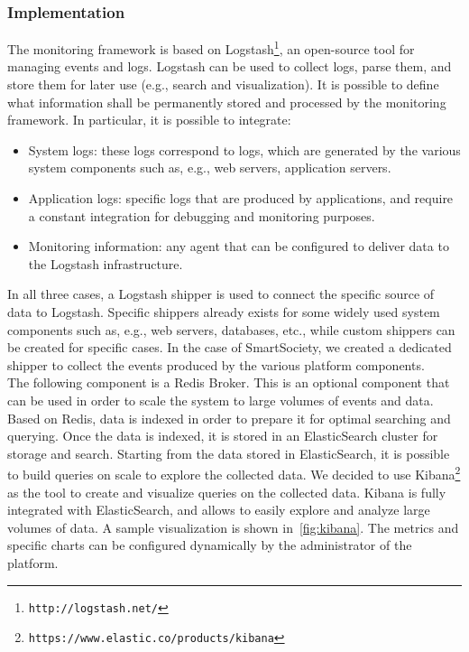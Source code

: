\subsubsection{Implementation}
The monitoring framework is based on Logstash\footnote{{\tt http://logstash.net/}}, an open-source tool for managing events and logs. Logstash can be used to collect logs, parse them, and store them for later use (e.g., search and visualization). %
It is possible to define what information shall be permanently stored and processed by the monitoring framework. In particular, it is possible to integrate:
\begin{itemize}
\item System logs: these logs correspond to logs, which are generated by the various system components such as, e.g., web servers, application servers. 
\item Application logs: specific logs that are produced by applications, and require a constant integration for debugging and monitoring purposes.
\item Monitoring information: any agent that can be configured to deliver data to the Logstash infrastructure.
\end{itemize}

In all three cases, a Logstash shipper is used to connect the specific source of data to Logstash. Specific shippers already exists for some widely used system components such as, e.g., web servers, databases, etc., while custom shippers can be created for specific cases. In the case of SmartSociety, we created a dedicated shipper to collect the events produced by the various platform components.\\
The following component is a Redis Broker. This is an optional component that can be used in order to scale the system to large volumes of events and data. Based on Redis, data is indexed in order to prepare it for optimal searching and querying. Once the data is indexed, it is stored in an ElasticSearch cluster for storage and search. 
Starting from the data stored in ElasticSearch, it is possible to build queries on scale to explore the collected data. We decided to use Kibana\footnote{{\tt https://www.elastic.co/products/kibana}} as the tool to create and visualize queries on the collected data. Kibana is fully integrated with ElasticSearch, and allows to easily explore and analyze large volumes of data. A sample visualization is shown in~\ref{fig:kibana}.  The metrics and specific charts can be configured dynamically by the administrator of the platform.
